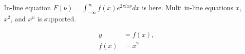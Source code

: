 
In-line equation $F(\nu) = \int_{-\infty}^{\infty} f(x) e^{2 \pi i x \nu} dx$ is here.
Multi in-line equations $x$, $x^2$, and $x^{n}$ is supported.

\begin{equation}
    \begin{split}
        y &= f(x), \\
        f(x) &= x^2
    \end{split}
\end{equation}

